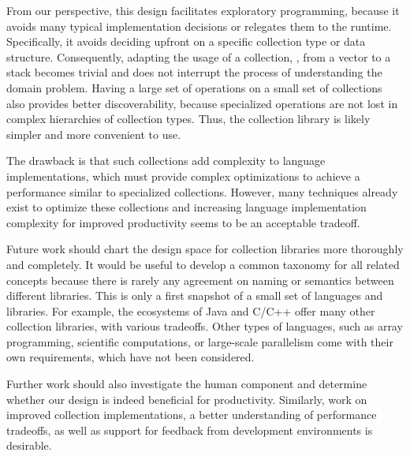 \documentclass[sigconf, 10pt]{acmart}
\begin{document}
From our perspective, this design facilitates exploratory programming,
because it avoids many typical implementation decisions or relegates them to the runtime.
Specifically, it avoids deciding upfront on a specific collection type
or data structure.
Consequently, adapting the usage of a collection,
\eg, from a vector to a stack becomes trivial
and does not interrupt the process of understanding the domain problem.
Having a large set of operations on a small set of collections also
provides better discoverability,
because specialized operations
are not lost in complex hierarchies of collection types.
Thus, the collection library is likely simpler and more convenient to use.

The drawback is that such collections
add complexity to language implementations,
which must provide complex optimizations
to achieve a performance similar to specialized collections.
However, many techniques already exist to optimize these collections
and increasing language implementation complexity for improved productivity
seems to be an acceptable tradeoff.

%


Future work should chart the design space for collection libraries more 
thoroughly and completely.
It would be useful to develop a common taxonomy for all related concepts
because there is rarely any agreement on naming or semantics between different
libraries.
This is only a first snapshot of a small set of languages and libraries.
For example, the ecosystems of Java and  C/C++
offer many other collection libraries,
with various tradeoffs.
Other types of languages, such as array programming,
scientific computations, or large-scale parallelism come with their own
requirements, which have not been considered.

Further work should also investigate the human component and determine whether
our design is indeed beneficial for productivity.
Similarly, work on improved collection implementations,
a better understanding of performance tradeoffs,
as well as support for feedback from development environments is desirable. 
\end{document}
